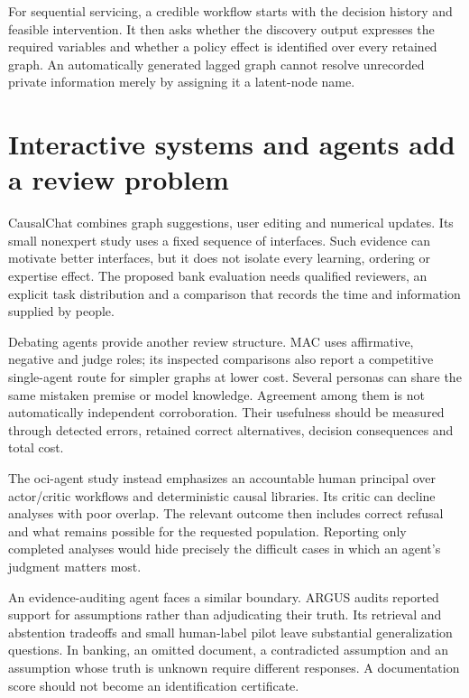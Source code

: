 For sequential servicing, a credible workflow starts with the decision history
and feasible intervention. It then asks whether the discovery output expresses
the required variables and whether a policy effect is identified over every
retained graph. An automatically generated lagged graph cannot resolve
unrecorded private information merely by assigning it a latent-node name.

\section{Interactive systems and agents add a review problem}

CausalChat combines graph suggestions, user editing and numerical updates.
Its small nonexpert study uses a fixed sequence of interfaces.
\cite{v12_la_2410_14146} Such evidence can motivate better interfaces, but it does
not isolate every learning, ordering or expertise effect. The proposed bank
evaluation needs qualified reviewers, an explicit task distribution and a
comparison that records the time and information supplied by people.

Debating agents provide another review structure. MAC uses affirmative,
negative and judge roles; its inspected comparisons also report a competitive
single-agent route for simpler graphs at lower cost. \cite{v12_la_2407_15073}
Several personas can share the same mistaken premise or model knowledge.
Agreement among them is not automatically independent corroboration. Their
usefulness should be measured through detected errors, retained correct
alternatives, decision consequences and total cost.

The oci-agent study instead emphasizes an accountable human principal over
actor/critic workflows and deterministic causal libraries. Its critic can
decline analyses with poor overlap. \cite{v12_la_2607_22443} The relevant outcome
then includes correct refusal and what remains possible for the requested
population. Reporting only completed analyses would hide precisely the
difficult cases in which an agent's judgment matters most.

An evidence-auditing agent faces a similar boundary. ARGUS audits reported
support for assumptions rather than adjudicating their truth. Its retrieval
and abstention tradeoffs and small human-label pilot leave substantial
generalization questions. \cite{v12_la_2609_30867} In banking, an omitted document,
a contradicted assumption and an assumption whose truth is unknown require
different responses. A documentation score should not become an identification
certificate.

